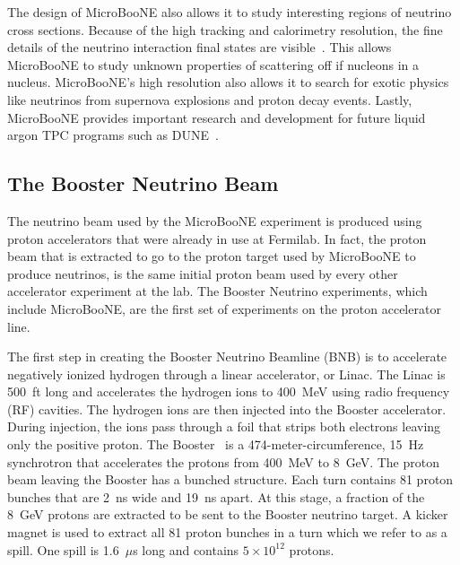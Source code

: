   The design of MicroBooNE also allows it to study interesting regions of
  neutrino cross sections. Because of the high tracking and calorimetry
  resolution, the fine details of the neutrino interaction final states are
  visible~\cite{Adams:2018fud}. This allows MicroBooNE to study unknown
  properties of scattering off if nucleons in a nucleus.  MicroBooNE's high
  resolution also allows it to search for exotic physics like neutrinos from
  supernova explosions and proton decay events. Lastly, MicroBooNE provides
  important research and development for future liquid argon TPC programs such
  as DUNE~\cite{Diwan:2016gmz}.

\subsection{The Booster Neutrino Beam}\label{sec:beam}
  The neutrino beam used by the MicroBooNE experiment is produced using proton
  accelerators that were already in use at Fermilab. In fact, the proton beam
  that is extracted to go to the proton target used by MicroBooNE to produce
  neutrinos, is the same initial proton beam used by every other accelerator
  experiment at the lab. The Booster Neutrino experiments, which include
  MicroBooNE, are the first set of experiments on the proton accelerator line.

  The first step in creating the Booster Neutrino Beamline (BNB) is to
  accelerate negatively ionized hydrogen through a linear accelerator, or
  Linac. The Linac is 500~ft long and accelerates the hydrogen ions to 400~MeV
  using radio frequency (RF) cavities. The hydrogen ions are then injected into
  the Booster accelerator. During injection, the ions pass through a foil that
  strips both electrons leaving only the positive proton.  The
  Booster~\cite{Aguilar-Arevalo:2008yp} is a 474-meter-circumference, 15~Hz
  synchrotron that accelerates the protons from 400~MeV to 8~GeV. The proton
  beam leaving the Booster has a bunched structure. Each turn contains 81
  proton bunches that are 2~ns wide and 19~ns apart. At this stage, a fraction
  of the 8~GeV protons are extracted to be sent to the Booster neutrino target.
  A kicker magnet is used to extract all 81 proton bunches in a turn which we
  refer to as a spill. One spill is 1.6~$\mu$s long and contains $5\times
  10^{12}$ protons.

